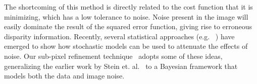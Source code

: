 
The shortcoming of this method is directly related to the cost
function that it is minimizing, which has a low tolerance to noise.
Noise present in the image will easily dominate the result of the
squared error function, giving rise to erroneous disparity
information.  Recently, several statistical
approaches (e.g. ~\cite{cheng04:bayesian}) have emerged to show how
stochastic models can be used to attenuate the effects of noise.  Our
sub-pixel refinement technique~\cite{Nefian09:bayesian} adopts some of
these ideas, generalizing the earlier work by Stein
et. al.~\cite{Stein06:attenuating} to a Bayesian framework that models
both the data and image noise.


